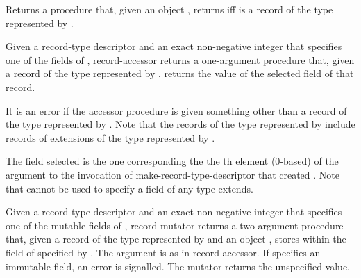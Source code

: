 \begin{entry}{%
}
   
Returns a procedure that, given an object , returns
\schtrue{} iff  is a record of the type represented by
.
\end{entry}

\begin{entry}{%
}
   
Given a record-type descriptor  and an exact non-negative
integer  that specifies one of the fields of , {\cf
  record-accessor} returns a one-argument procedure that, given a
record of the type represented by , returns the value of the
selected field of that record.

It is an error if the accessor procedure is given something other than
a record of the type represented by . Note that the records
of the type represented by  include records of extensions of
the type represented by .

The field selected is the one corresponding the the th element
(0-based) of the  argument to the invocation of {\cf
  make-record-type-descriptor} that created . Note that
 cannot be used to specify a field of any type  extends.
\end{entry}

\begin{entry}{%
}
   
Given a record-type descriptor  and an exact non-negative
integer  that specifies one of the mutable fields of ,
{\cf record-mutator} returns a two-argument procedure that, given a
record  of the type represented by  and an object
, stores  within the field of  specified by
. The  argument is as in {\cf record-accessor}. If
 specifies an immutable field, an error is signalled.
The mutator returns the unspecified value.
\end{entry}

